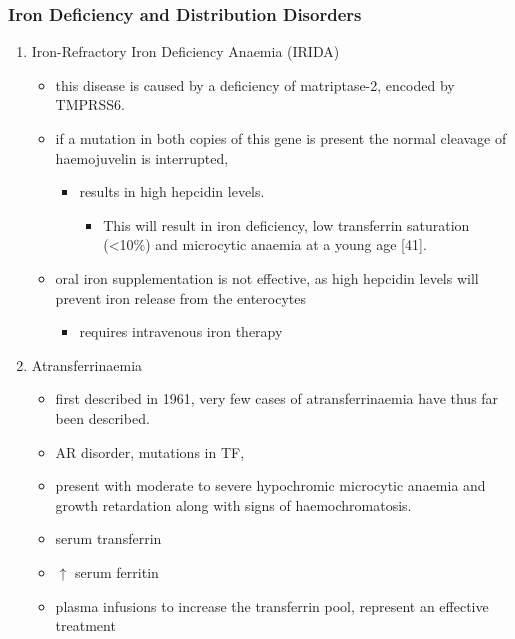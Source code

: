 \documentclass{scrartcl}
\begin{document}
\subsubsection{Iron Deficiency and Distribution Disorders}
\label{sec:org986629f}
\begin{enumerate}
\item Iron-Refractory Iron Deficiency Anaemia (IRIDA)
\label{sec:org92d3d16}
\begin{itemize}
\item this disease is caused by a deficiency of matriptase-2, encoded by TMPRSS6.
\item if a mutation in both copies of this gene is present the normal cleavage of haemojuvelin is interrupted,
\begin{itemize}
\item results in high hepcidin levels.
\begin{itemize}
\item This will result in iron deficiency, low transferrin saturation
(<10\%) and microcytic anaemia at a young age [41].
\end{itemize}
\end{itemize}
\item oral iron supplementation is not effective, as high hepcidin
levels will prevent iron release from the enterocytes
\begin{itemize}
\item requires intravenous iron therapy
\end{itemize}
\end{itemize}

\item Atransferrinaemia
\label{sec:org55dfece}
\begin{itemize}
\item first described in 1961, very few cases of atransferrinaemia have thus far been described.
\item AR disorder, mutations in TF,
\item present with moderate to severe hypochromic microcytic anaemia and growth retardation along with signs of haemochromatosis.
\item \downarrown serum transferrin
\item \(\uparrow\) serum ferritin
\item plasma infusions to increase the transferrin pool, represent an
effective treatment
\end{itemize}
\end{enumerate}
\end{document}
